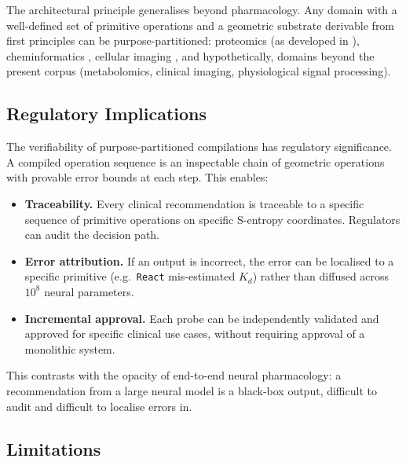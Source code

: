\documentclass[11pt,twocolumn,a4paper]{article}
\theoremstyle{definition}
\theoremstyle{remark}
\begin{document}
The architectural principle generalises beyond pharmacology. Any domain with a well-defined set of primitive operations and a geometric substrate derivable from first principles can be purpose-partitioned: proteomics (as developed in \citep{sachikonye2025b}), cheminformatics \citep{sachikonye2025d}, cellular imaging \citep{sachikonye2025f}, and hypothetically, domains beyond the present corpus (metabolomics, clinical imaging, physiological signal processing).

\subsection{Regulatory Implications}

The verifiability of purpose-partitioned compilations has regulatory significance. A compiled operation sequence is an inspectable chain of geometric operations with provable error bounds at each step. This enables:

\begin{itemize}[nosep,leftmargin=*]
\item \textbf{Traceability.} Every clinical recommendation is traceable to a specific sequence of primitive operations on specific S-entropy coordinates. Regulators can audit the decision path.
\item \textbf{Error attribution.} If an output is incorrect, the error can be localised to a specific primitive (e.g.\ \texttt{React} mis-estimated $K_d$) rather than diffused across $10^8$ neural parameters.
\item \textbf{Incremental approval.} Each probe can be independently validated and approved for specific clinical use cases, without requiring approval of a monolithic system.
\end{itemize}

This contrasts with the opacity of end-to-end neural pharmacology: a recommendation from a large neural model is a black-box output, difficult to audit and difficult to localise errors in.

\subsection{Limitations}
\end{document}
